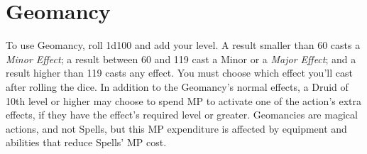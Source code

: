 \setcounter{secnumdepth}{0}
\setcounter{tocdepth}{0}

\section*{Geomancy}
    To use Geomancy, roll 1d100 and add your level. A result smaller than 60 casts a \textit{Minor Effect}; a 
result between 60 and 119 cast a Minor or a \textit{Major Effect}; and a result higher than 119 casts any effect. 
You must choose which effect you'll cast after rolling the dice. In addition to the Geomancy’s normal 
effects, a Druid of 10th level or higher may choose to spend MP to activate one of the action’s extra effects, 
if they have the effect’s required level or greater. Geomancies are magical actions, and not Spells, but this 
MP expenditure is affected by equipment and abilities that reduce Spells’ MP cost.

